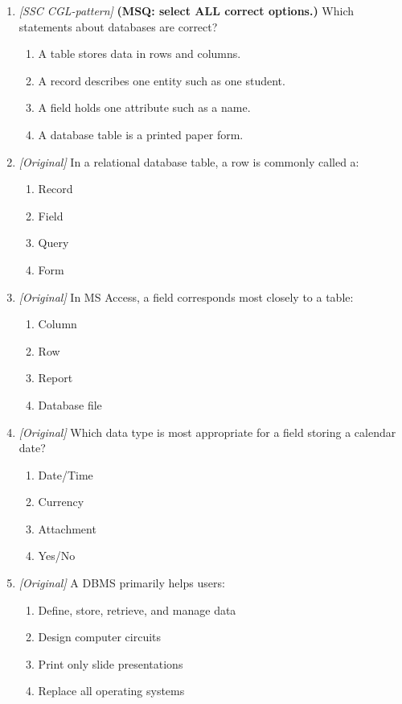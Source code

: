 \begin{enumerate}[label=\textbf{Q\arabic*.}, leftmargin=*]
\begin{enumerate}[label=\Alph*.]
    \item Fields (columns)
    \item Primary key values
    \item Printer ink levels
  \end{enumerate}
\item \textit{[SSC CGL-pattern]} \textbf{(MSQ: select ALL correct options.)} Which statements about databases are correct?
  \begin{enumerate}[label=\Alph*.]
    \item A table stores data in rows and columns.
    \item A record describes one entity such as one student.
    \item A field holds one attribute such as a name.
    \item A database table is a printed paper form.
  \end{enumerate}
\item \textit{[Original]} In a relational database table, a row is commonly called a:
  \begin{enumerate}[label=\Alph*.]
\item Record
   \item Field
   \item Query
   \item Form
  \end{enumerate}

\item \textit{[Original]} In MS Access, a field corresponds most closely to a table:
  \begin{enumerate}[label=\Alph*.]
\item Column
   \item Row
   \item Report
   \item Database file
  \end{enumerate}

\item \textit{[Original]} Which data type is most appropriate for a field storing a calendar date?
  \begin{enumerate}[label=\Alph*.]
\item Date/Time
   \item Currency
   \item Attachment
   \item Yes/No
  \end{enumerate}

\item \textit{[Original]} A DBMS primarily helps users:
  \begin{enumerate}[label=\Alph*.]
\item Define, store, retrieve, and manage data
   \item Design computer circuits
   \item Print only slide presentations
   \item Replace all operating systems
  \end{enumerate}


\end{enumerate}
